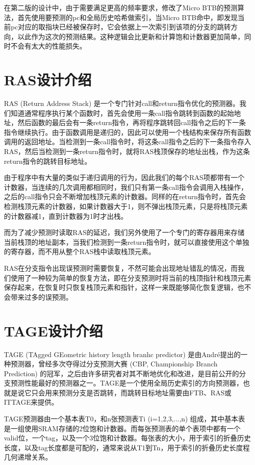 在第二版的设计中，由于需要满足更高的频率要求，修改了Micro BTB的预测算法，首先使用要预测的pc和全局历史哈希做索引，当Micro BTB命中，即发现当前pc对应的取指块已经被保存时，它会依据上一次索引到该项的分支的跳转方向，以此作为这次的预测结果。这种逻辑会比更新和计算饱和计数器更加简单，同时不会有太大的性能损失。

\section{RAS设计介绍}

RAS (Return Address Stack) 是一个专门针对call和return指令优化的预测器。我们知道通常程序执行某个函数时，首先会使用一条call指令跳转到函数的起始地址，然后函数的最后会有一条return指令，再将程序跳转回call指令之后的下一条指令继续执行。由于函数调用是递归的，因此可以使用一个栈结构来保存所有函数调用的返回地址。当检测到一条call指令时，将这条call指令之后的下一条指令存入RAS，然后当检测到一条return指令时，就将RAS栈顶保存的地址出栈，作为这条return指令的跳转目标地址。

由于程序中有大量的类似于递归调用的行为，因此我们的每个RAS项都带有一个计数器，当连续的几次调用都相同时，我们只有第一条call指令会调用入栈操作，之后的call指令只会不断增加栈顶元素的计数器。同样的在return指令时，首先会检测栈顶元素的计数器，如果计数器大于1，则不弹出栈顶元素，只是将栈顶元素的计数器减1，直到计数器为1时才出栈。

而为了减少预测时读取RAS的延迟，我们另外使用了一个专门的寄存器用来存储当前栈顶的地址副本，当我们检测到一条return指令时，就可以直接使用这个单独的寄存器，而不用从整个RAS栈中读取栈顶元素。

RAS在分支指令出现误预测时需要恢复，不然可能会出现地址错乱的情况，而我们使用了一种较为简单的恢复方法，即在分支预测时将当前的栈顶指针和栈顶元素保存起来，在恢复时只恢复栈顶元素和指针，这样一来既能够简化恢复逻辑，也不会带来过多的误预测。

\section{TAGE设计介绍}

TAGE (TAgged GEometric history length branhc predictor) 是由André提出的一种预测器，曾经多次夺得过分支预测大赛 (CBP, Championship Branch Prediction) 的冠军，之后由许多研究者对其不断地优化和改进，是目前公开的分支预测性能最好的预测器之一。TAGE是一个使用全局历史索引的方向预测器，也就是说它只会用来预测分支是否跳转，而跳转目标地址需要由FTB、RAS或ITTAGE来提供。

TAGE预测器由一个基本表T0，和n张预测表Ti (i=1,2,3,...,n) 组成，其中基本表是一组使用SRAM存储的2位饱和计数器。而每张预测表的单个表项中都有一个valid位，一个tag，以及一个3位饱和计数器。每张表的大小，用于索引的折叠历史长度，以及tag长度都是可配的，通常来说从T1到Tn，用于索引的折叠历史长度程几何递增关系。

